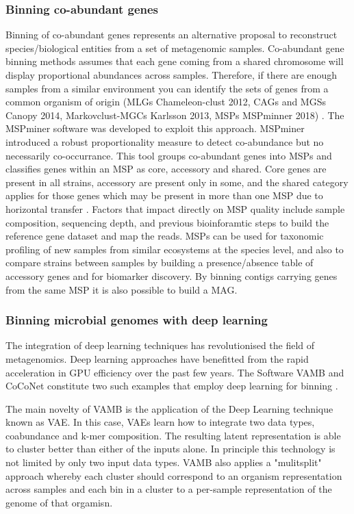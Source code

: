 \documentclass{article}
\begin{document}
\subsubsection{Binning co-abundant genes}
Binning of co-abundant genes represents an alternative proposal to reconstruct species/biological entities from a set of metagenomic samples.
Co-abundant gene binning methods assumes that each gene coming from a shared chromosome will display proportional abundances across samples.
Therefore, if there are enough samples from a similar environment you can identify the sets of genes from a common organism of origin (MLGs Chameleon-clust 2012, CAGs and MGSs Canopy 2014, Markovclust-MGCs Karlsson 2013, \glspl{MSP} MSPminner 2018) \cite{karypis1999chameleon, plaza2019mspminer}.
The MSPminer software was developed to exploit this approach.
MSPminer introduced a robust proportionality measure to detect co-abundance but no necessarily co-occurrance.
This tool groups co-abundant genes into \glspl{MSP} and classifies genes within an \gls{MSP} as core, accessory and shared.
Core genes are present in all strains, accessory are present only in some, and the shared category applies for those genes which may be present in more than one \gls{MSP} due to horizontal transfer \cite{tettelin2005genome}.
Factors that impact directly on \gls{MSP} quality include sample composition, sequencing depth, and previous bioinforamtic steps to build the reference gene dataset and map the reads.
\glspl{MSP} can be used for taxonomic profiling of new samples from similar ecosystems at the species level, and also to compare strains between samples by building a presence/absence table of accessory genes and for biomarker discovery.
By binning contigs carrying genes from the same \gls{MSP} it is also possible to build a \gls{MAG}.

\subsubsection{Binning microbial genomes with deep learning}
The integration of deep learning techniques has revolutionised the field of metagenomics.
Deep learning approaches have benefitted from the rapid acceleration in GPU efficiency over the past few years.
The Software VAMB and CoCoNet constitute two such examples that employ deep learning for binning \cite{nissenimproved, arisdakessian2021coconet}.

The main novelty of VAMB is the application of the Deep Learning technique known as \gls{VAE}.
In this case, \glspl{VAE} learn how to integrate two data types, coabundance and k-mer composition.
The resulting latent representation is able to cluster better than either of the inputs alone.
In principle this technology is not limited by only two input data types.
VAMB also applies a "mulitsplit" approach whereby each cluster should correspond to an organism representation across samples and each bin in a cluster to a per-sample representation of the genome of that orgamisn.
\end{document}
